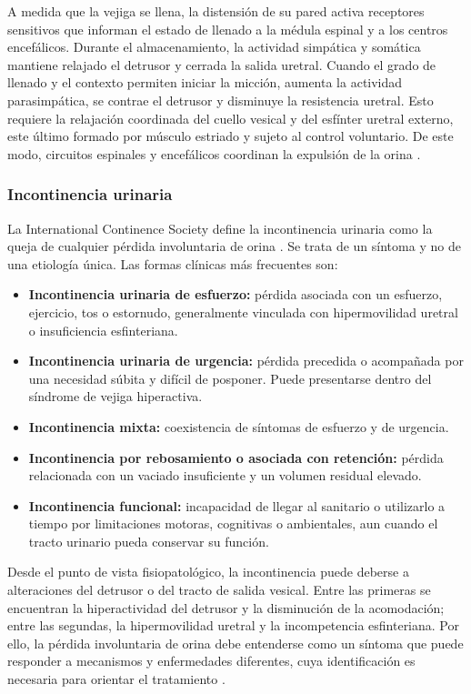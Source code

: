 \documentclass[12pt,a4paper]{article}
\begin{document}
A medida que la vejiga se llena, la distensión de su pared activa receptores sensitivos que informan
el estado de llenado a la médula espinal y a los centros encefálicos. Durante el almacenamiento, la
actividad simpática y somática mantiene relajado el detrusor y cerrada la salida uretral. Cuando el
grado de llenado y el contexto permiten iniciar la micción, aumenta la actividad parasimpática, se
contrae el detrusor y disminuye la resistencia uretral. Esto requiere la relajación coordinada del
cuello vesical y del esfínter uretral externo, este último formado por músculo estriado y sujeto al
control voluntario. De este modo, circuitos espinales y encefálicos coordinan la expulsión de la orina
\cite{fowler2008neural,lanzotti2023physiology}.


\subsubsection{Incontinencia urinaria}

La International Continence Society define la incontinencia urinaria como la queja de cualquier pérdida
involuntaria de orina \cite{abrams2002standardisation}. Se trata de un síntoma y no de una etiología
única. Las formas clínicas más frecuentes son:

\begin{itemize}
    \item \textbf{Incontinencia urinaria de esfuerzo:} pérdida asociada con un esfuerzo, ejercicio,
    tos o estornudo, generalmente vinculada con hipermovilidad uretral o insuficiencia esfinteriana.
    \item \textbf{Incontinencia urinaria de urgencia:} pérdida precedida o acompañada por una necesidad
    súbita y difícil de posponer. Puede presentarse dentro del síndrome de vejiga hiperactiva.
    \item \textbf{Incontinencia mixta:} coexistencia de síntomas de esfuerzo y de urgencia.
    \item \textbf{Incontinencia por rebosamiento o asociada con retención:} pérdida relacionada con un
    vaciado insuficiente y un volumen residual elevado.
    \item \textbf{Incontinencia funcional:} incapacidad de llegar al sanitario o utilizarlo a tiempo
    por limitaciones motoras, cognitivas o ambientales, aun cuando el tracto urinario pueda conservar
    su función.
\end{itemize}

Desde el punto de vista fisiopatológico, la incontinencia puede deberse a alteraciones del detrusor o
del tracto de salida vesical. Entre las primeras se encuentran la hiperactividad del detrusor y la
disminución de la acomodación; entre las segundas, la hipermovilidad uretral y la incompetencia
esfinteriana. Por ello, la pérdida involuntaria de orina debe entenderse como un síntoma que puede
responder a mecanismos y enfermedades diferentes, cuya identificación es necesaria para orientar el
tratamiento \cite{chiang2013incontinencia}.
\end{document}
